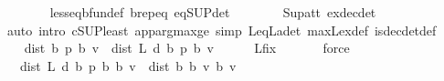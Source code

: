 \begin{isabellebody}
\ \ \ \ \ \ \isamarkupfalse%
\ less{\isacharunderscore}{\kern0pt}eq{\isacharunderscore}{\kern0pt}bfun{\isacharunderscore}{\kern0pt}def\ {\isasymL}\isactrlsub b{\isachardot}{\kern0pt}rep{\isacharunderscore}{\kern0pt}eq\ {\isasymL}{\isacharunderscore}{\kern0pt}eq{\isacharunderscore}{\kern0pt}SUP{\isacharunderscore}{\kern0pt}det\isanewline
\ \ \ \ \ \ \isamarkupfalse%
\ Sup{\isacharunderscore}{\kern0pt}att\ ex{\isacharunderscore}{\kern0pt}dec{\isacharunderscore}{\kern0pt}det\isanewline
\ \ \ \ \ \ \isamarkupfalse%
\ {\isacharparenleft}{\kern0pt}auto\ intro{\isacharbang}{\kern0pt}{\isacharcolon}{\kern0pt}\ cSUP{\isacharunderscore}{\kern0pt}least\ app{\isacharunderscore}{\kern0pt}arg{\isacharunderscore}{\kern0pt}max{\isacharunderscore}{\kern0pt}ge\ simp{\isacharcolon}{\kern0pt}\ L{\isacharunderscore}{\kern0pt}eq{\isacharunderscore}{\kern0pt}L\isactrlsub a{\isacharunderscore}{\kern0pt}det\ max{\isacharunderscore}{\kern0pt}L{\isacharunderscore}{\kern0pt}ex{\isacharunderscore}{\kern0pt}def\ is{\isacharunderscore}{\kern0pt}dec{\isacharunderscore}{\kern0pt}det{\isacharunderscore}{\kern0pt}def{\isacharparenright}{\kern0pt}\isanewline
\ \ \isamarkupfalse%
\isanewline
\ \ \isamarkupfalse%
\ {\isachardoublequoteopen}dist\ {\isacharparenleft}{\kern0pt}{\isasymnu}\isactrlsub b\ {\isacharquery}{\kern0pt}p{\isacharparenright}{\kern0pt}\ {\isacharparenleft}{\kern0pt}{\isasymL}\isactrlsub b\ v{\isacharparenright}{\kern0pt}\ {\isacharequal}{\kern0pt}\ dist\ {\isacharparenleft}{\kern0pt}L\ {\isacharquery}{\kern0pt}d\ {\isacharparenleft}{\kern0pt}{\isasymnu}\isactrlsub b\ {\isacharquery}{\kern0pt}p{\isacharparenright}{\kern0pt}{\isacharparenright}{\kern0pt}\ {\isacharparenleft}{\kern0pt}{\isasymL}\isactrlsub b\ v{\isacharparenright}{\kern0pt}{\isachardoublequoteclose}\isanewline
\ \ \ \ \isamarkupfalse%
\ L{\isacharunderscore}{\kern0pt}{\isasymnu}{\isacharunderscore}{\kern0pt}fix\ \isanewline
\ \ \ \ \isamarkupfalse%
\ force\isanewline
\ \ \isamarkupfalse%
\ \isamarkupfalse%
\ {\isachardoublequoteopen}{\isasymdots}\ {\isasymle}\ dist\ {\isacharparenleft}{\kern0pt}L\ {\isacharquery}{\kern0pt}d\ {\isacharparenleft}{\kern0pt}{\isasymnu}\isactrlsub b\ {\isacharquery}{\kern0pt}p{\isacharparenright}{\kern0pt}{\isacharparenright}{\kern0pt}\ {\isacharparenleft}{\kern0pt}{\isasymL}\isactrlsub b\ {\isacharparenleft}{\kern0pt}{\isasymL}\isactrlsub b\ v{\isacharparenright}{\kern0pt}{\isacharparenright}{\kern0pt}\ {\isacharplus}{\kern0pt}\ dist\ {\isacharparenleft}{\kern0pt}{\isasymL}\isactrlsub b\ {\isacharparenleft}{\kern0pt}{\isasymL}\isactrlsub b\ v{\isacharparenright}{\kern0pt}{\isacharparenright}{\kern0pt}\ {\isacharparenleft}{\kern0pt}{\isasymL}\isactrlsub b\ v{\isacharparenright}{\kern0pt}{\isachardoublequoteclose}\isanewline

\end{isabellebody}
